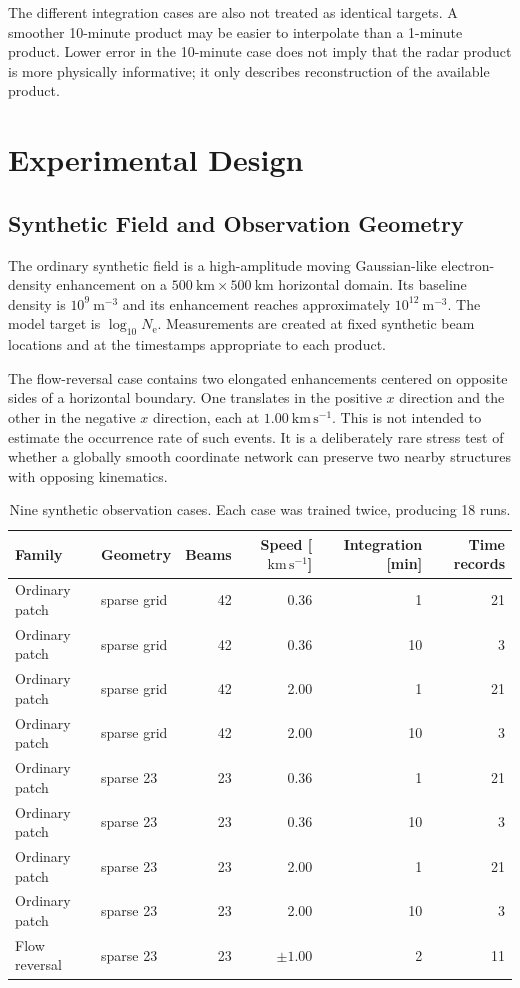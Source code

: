 \documentclass[11pt]{article}
\newcommand{\Ne}{N_{\mathrm e}}
\newcommand{\kmps}{\mathrm{km\,s^{-1}}}
\begin{document}
The different integration cases are also not treated as identical targets. A smoother 10-minute product may
be easier to interpolate than a 1-minute product. Lower error in the 10-minute case does not imply that the
radar product is more physically informative; it only describes reconstruction of the available product.

\section{Experimental Design}

\subsection{Synthetic Field and Observation Geometry}

The ordinary synthetic field is a high-amplitude moving Gaussian-like electron-density enhancement on a
$500~\mathrm{km}\times 500~\mathrm{km}$ horizontal domain. Its baseline density is $10^9~\mathrm{m^{-3}}$
and its enhancement reaches approximately $10^{12}~\mathrm{m^{-3}}$. The model target is
$\log_{10}\Ne$. Measurements are created at fixed synthetic beam locations and at the timestamps appropriate
to each product.

The flow-reversal case contains two elongated enhancements centered on opposite sides of a horizontal
boundary. One translates in the positive $x$ direction and the other in the negative $x$ direction, each at
$1.00~\kmps$. This is not intended to estimate the occurrence rate of such events. It is a deliberately rare
stress test of whether a globally smooth coordinate network can preserve two nearby structures with opposing
kinematics.

\begin{table}[H]
\centering
\caption{Nine synthetic observation cases. Each case was trained twice, producing 18 runs.}
\label{tab:cases}
\small
\begin{tabular}{llrrrr}
\toprule
Family & Geometry & Beams & Speed [$\kmps$] & Integration [min] & Time records \\
\midrule
Ordinary patch & sparse grid & 42 & 0.36 & 1 & 21 \\
Ordinary patch & sparse grid & 42 & 0.36 & 10 & 3 \\
Ordinary patch & sparse grid & 42 & 2.00 & 1 & 21 \\
Ordinary patch & sparse grid & 42 & 2.00 & 10 & 3 \\
Ordinary patch & sparse 23 & 23 & 0.36 & 1 & 21 \\
Ordinary patch & sparse 23 & 23 & 0.36 & 10 & 3 \\
Ordinary patch & sparse 23 & 23 & 2.00 & 1 & 21 \\
Ordinary patch & sparse 23 & 23 & 2.00 & 10 & 3 \\
Flow reversal & sparse 23 & 23 & $\pm 1.00$ & 2 & 11 \\
\bottomrule
\end{tabular}
\end{table}
\end{document}
